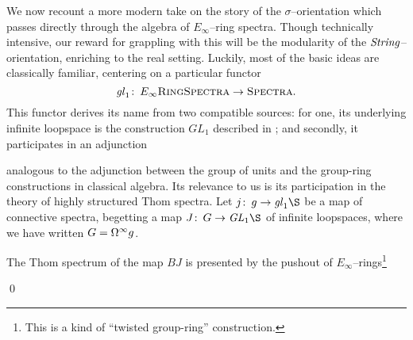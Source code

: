 We now recount a more modern take on the story of the \(\sigma\)--orientation which passes directly through the algebra of \(E_\infty\)--ring spectra.  Though technically intensive, our reward for grappling with this will be the modularity of the \(\mathit{String}\)--orientation, enriching  to the real setting.  Luckily, most of the basic ideas are classically familiar, centering on a particular functor \[\mathit{gl}_1\colon\thinspace E_\infty\normalfont\textsc{RingSpectra} \to \normalfont\textsc{Spectra}.\]  This functor derives its name from two compatible sources: for one, its underlying infinite loopspace is the construction \(GL_1\) described in ; and secondly, it participates in an adjunction
\begin{center}
\end{center}
analogous to the adjunction between the group of units and the group-ring constructions in classical algebra.  Its relevance to us is its participation in the theory of highly structured Thom spectra.  Let \(j\co g \to \gl_1 \S\) be a map of connective spectra, begetting a map \(J\co G \to \GL_1 \S\) of infinite loopspaces, where we have written \(G = \Omega^\infty g\).
\begin{lemma}
The Thom spectrum of the map \(BJ\) is presented by the pushout of \(E_\infty\)--rings\footnote{This is a kind of ``twisted group-ring'' construction.}
\begin{center}
\end{center}
\qed
\end{lemma}

